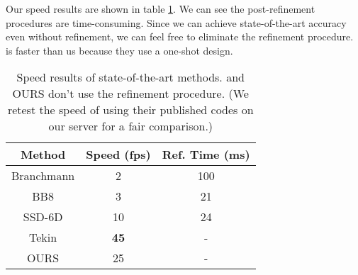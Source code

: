 \documentclass[10pt,twocolumn,letterpaper]{article}
\begin{document}
Our speed results are shown in table \ref{tb:speed}. We can see the post-refinement procedures are time-consuming. Since we can achieve state-of-the-art accuracy even without refinement, we can feel free to eliminate the refinement procedure. \cite{tekin18} is faster than us because they use a one-shot design.
\begin{table}[]
\begin{center}
\begin{tabular}{c|c|c}
\hline
Method     & Speed (fps) & Ref. Time (ms)\\ \hline
Branchmann \cite{7780735} & 2  &100                 \\
BB8 \cite{Rad2017BB8AS}  & 3  &21                 \\
SSD-6D \cite{Kehl2017SSD6DMR}    & 10  &24                \\
Tekin \cite{tekin18}     & \textbf{45} &-     \\
OURS       & 25  &-               \\ \hline
\end{tabular}
\end{center}
\caption{Speed results of state-of-the-art methods. \cite{tekin18} and OURS don't use the refinement procedure. (We retest the speed of \cite{tekin18} using their published codes on our server for a fair comparison.)}
\label{tb:speed}
\end{table}
\end{document}
